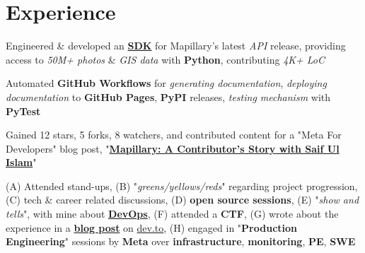 \documentclass[]{openfont}
\begin{document}
\hfill
\begin{minipage}[t]{0.65\textwidth} 


\section{Experience}
\vspace{\topsep}
\begin{tightemize}
    \item Engineered \& developed an \textbf{\href{https://github.com/facebookincubator/mapillary-python-sdk}{SDK}} for Mapillary's latest \textit{API} release, providing access to \textit{50M+ photos} \& \textit{GIS data} with \textbf{Python}, contributing \textit{4K+ LoC}

    \item Automated \textbf{GitHub Workflows} for \textit{generating documentation}, \textit{deploying documentation} to \textbf{GitHub Pages}, \textbf{PyPI} releases, \textit{testing mechanism} with \textbf{PyTest}

    \item Gained 12 stars, 5 forks, 8 watchers, and contributed content for a "Meta For Developers" blog post, "\href{https://developers.facebook.com/blog/post/2022/01/04/mapillary-contributor-story-saif-ul-islam/}{\textbf{Mapillary: A Contributor’s Story with Saif Ul Islam}}"
\end{tightemize}
\sectionsep

\begin{tightemize}
    \item (A) Attended stand-ups, (B) "\textit{greens/yellows/reds}" regarding project progression, (C) tech \& career related discussions, (D) \textbf{open source sessions}, (E) "\textit{show and tells}", with mine about \textbf{\href{https://docs.google.com/presentation/d/1HK-APNPhx1so6GklqtKuFHwMSWU67delCjWtVDOA3MA/edit?usp=sharing}{DevOps}}, (F) attended a \textbf{CTF}, (G) wrote about the experience in a \href{https://dev.to/rubix982/mlh-open-source-mapillary-me-nji}{\textbf{blog post}} on \href{https://dev.to/}{dev.to}, (H) engaged in "\textbf{Production Engineering}" sessions by \textbf{Meta} over \textbf{infrastructure}, \textbf{monitoring}, \textbf{PE}, \textbf{SWE}
    

\end{tightemize}
\end{minipage}
\end{document}
